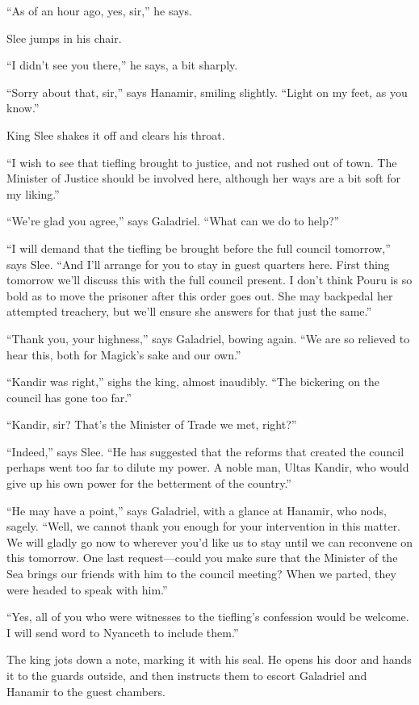 \documentclass[smalldemyvopaper,11pt,twoside,onecolumn,openright,extrafontsizes]{memoir}
\begin{document}
``As of an hour ago, yes, sir,'' he says.

Slee jumps in his chair.

``I didn't see you there,'' he says, a bit sharply.

``Sorry about that, sir,'' says Hanamir, smiling slightly. ``Light on my
feet, as you know.''

King Slee shakes it off and clears his throat.

``I wish to see that tiefling brought to justice, and not rushed out of
town. The Minister of Justice should be involved here, although her ways
are a bit soft for my liking.''

``We're glad you agree,'' says Galadriel. ``What can we do to help?''

``I will demand that the tiefling be brought before the full council
tomorrow,'' says Slee. ``And I'll arrange for you to stay in guest
quarters here. First thing tomorrow we'll discuss this with the full
council present. I don't think Pouru is so bold as to move the prisoner
after this order goes out. She may backpedal her attempted treachery,
but we'll ensure she answers for that just the same.''

``Thank you, your highness,'' says Galadriel, bowing again. ``We are so
relieved to hear this, both for Magick's sake and our own.''

``Kandir was right,'' sighs the king, almost inaudibly. ``The bickering
on the council has gone too far.''

``Kandir, sir? That's the Minister of Trade we met, right?''

``Indeed,'' says Slee. ``He has suggested that the reforms that created
the council perhaps went too far to dilute my power. A noble man, Ultas
Kandir, who would give up his own power for the betterment of the
country.''

``He may have a point,'' says Galadriel, with a glance at Hanamir, who
nods, sagely. ``Well, we cannot thank you enough for your intervention
in this matter. We will gladly go now to wherever you'd like us to stay
until we can reconvene on this tomorrow. One last request---could you
make sure that the Minister of the Sea brings our friends with him to
the council meeting? When we parted, they were headed to speak with
him.''

``Yes, all of you who were witnesses to the tiefling's confession would
be welcome. I will send word to Nyanceth to include them.''

The king jots down a note, marking it with his seal. He opens his door
and hands it to the guards outside, and then instructs them to escort
Galadriel and Hanamir to the guest chambers.
\end{document}
